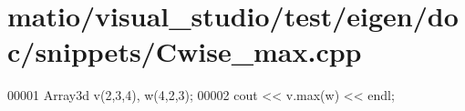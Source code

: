 \hypertarget{matio_2visual__studio_2test_2eigen_2doc_2snippets_2_cwise__max_8cpp_source}{}\section{matio/visual\+\_\+studio/test/eigen/doc/snippets/\+Cwise\+\_\+max.cpp}
\label{matio_2visual__studio_2test_2eigen_2doc_2snippets_2_cwise__max_8cpp_source}

\begin{DoxyCode}
00001 Array3d v(2,3,4), w(4,2,3);
00002 cout << v.max(w) << endl;
\end{DoxyCode}
